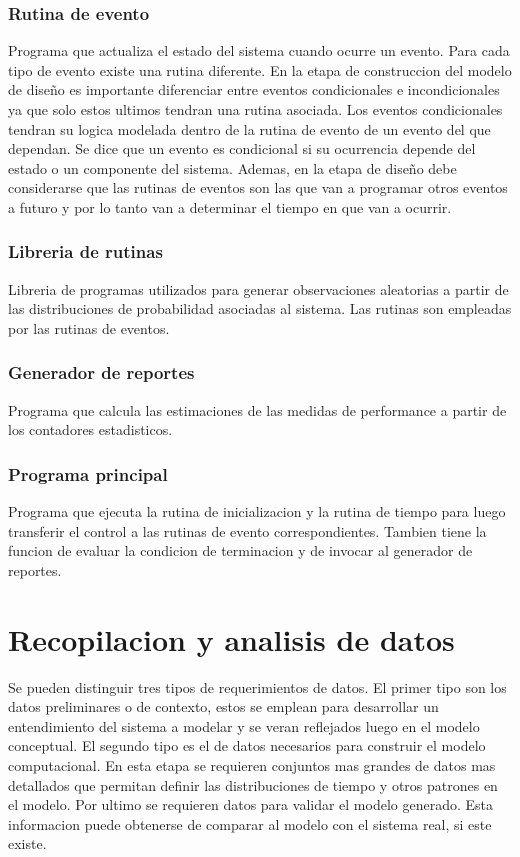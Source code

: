 \documentclass[a4paper]{article}
\begin{document}
\subsubsection*{Rutina de evento}
Programa que actualiza el estado del sistema cuando ocurre un evento. Para cada 
tipo de evento existe una rutina diferente. En la etapa de construccion del 
modelo de diseño es importante diferenciar entre eventos condicionales e 
incondicionales ya que solo estos ultimos tendran una rutina asociada. 
Los eventos condicionales tendran su logica modelada dentro de la rutina de 
evento de un evento del que dependan.
Se dice que un evento es condicional si su ocurrencia depende del estado o un 
componente del sistema.
Ademas, en la etapa de diseño debe considerarse que las rutinas de eventos son las 
que van a programar otros eventos a futuro y por lo tanto van a determinar el tiempo 
en que van a ocurrir.

\subsubsection*{Libreria de rutinas}
Libreria de programas utilizados para generar observaciones aleatorias a partir 
de las distribuciones de probabilidad asociadas al sistema. Las rutinas son 
empleadas por las rutinas de eventos.

\subsubsection*{Generador de reportes}
Programa que calcula las estimaciones de las medidas de performance %
a partir de los contadores estadisticos.

\subsubsection*{Programa principal}
Programa que ejecuta la rutina de inicializacion y la rutina de tiempo para luego 
transferir el control a las rutinas de evento correspondientes. Tambien tiene la 
funcion de evaluar la condicion de terminacion y de invocar al generador de reportes.


\section*{Recopilacion y analisis de datos}
Se pueden distinguir tres tipos de requerimientos de datos. El primer tipo son 
los datos preliminares o de contexto, estos se emplean para desarrollar un 
entendimiento del sistema a modelar y se veran reflejados luego en el modelo 
conceptual.
El segundo tipo es el de datos necesarios para construir el modelo computacional.
En esta etapa se requieren conjuntos mas grandes de datos mas detallados que 
permitan definir las distribuciones de tiempo y otros patrones en el modelo.
Por ultimo se requieren datos para validar el modelo generado.
Esta informacion puede obtenerse de comparar al modelo con el sistema real,
si este existe.
\end{document}
